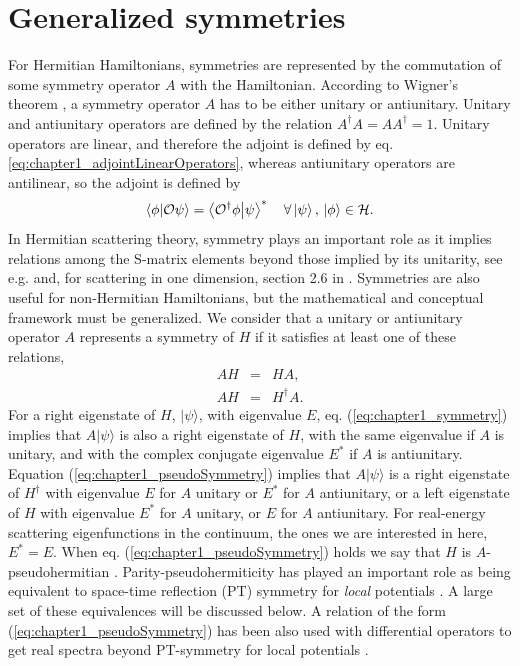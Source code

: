\section{Generalized symmetries\label{sec:chapter1_generalizedSymmetries}}

For Hermitian  Hamiltonians, symmetries are represented by the commutation of some symmetry operator $A$ with the Hamiltonian. According to Wigner's theorem \cite{Wigner1959}, a symmetry operator $A$ has to be either unitary or antiunitary. Unitary and antiunitary operators are defined by the relation $A^\dagger A = A A^\dagger = 1$. Unitary operators are linear, and therefore the adjoint is defined by eq. \eqref{eq:chapter1_adjointLinearOperators}, whereas antiunitary operators are antilinear, so the adjoint is defined by
%
\begin{equation}
  \braket{\phi}{\mathcal{O}\psi} = \braket{\mathcal{O}^\dagger\phi}{\psi}^*\quad\forall\ket{\psi},\,\ket{\phi}\in\mathcal{H}.
  \label{eq:chapter1_adjointAntiLinearOperators}
\end{equation}
%
In Hermitian scattering theory, symmetry plays an important role  as it implies relations among
the S-matrix elements beyond those implied by its unitarity, see e.g. \cite{Taylor1972} and, for scattering in one dimension, section 2.6 in \cite{Muga2004}. Symmetries are also useful for  non-Hermitian Hamiltonians, but the mathematical and conceptual
framework must be generalized. We consider that a unitary or antiunitary operator $A$ represents a symmetry of $H$ if it satisfies at least one of these relations,
%
\begin{eqnarray}
  AH&=&HA,
  \label{eq:chapter1_symmetry}
  \\
  AH&=&H^\dagger A.
  \label{eq:chapter1_pseudoSymmetry}
\end{eqnarray}
%
For a right eigenstate of $H$, $|\psi\rangle$,
with eigenvalue $E$, eq. (\ref{eq:chapter1_symmetry}) implies that
$A|\psi\rangle$ is also a right  eigenstate of $H$, with the
same eigenvalue if $A$ is unitary, and with the complex conjugate eigenvalue $E^*$ if $A$ is antiunitary.
Equation (\ref{eq:chapter1_pseudoSymmetry}) implies that $A|\psi\rangle$ is a right eigenstate of $H^\dagger$
with eigenvalue $E$ for $A$ unitary or $E^*$ for $A$ antiunitary, or a left eigenstate of $H$ with eigenvalue $E^*$ for $A$ unitary, or $E$
for $A$ antiunitary. For real-energy scattering
eigenfunctions in the continuum, the ones we are interested in here, $E^*=E$.
When eq. (\ref{eq:chapter1_pseudoSymmetry}) holds we say that $H$ is $A$-pseudohermitian \cite{Mostafazadeh2010}.
Parity-pseudohermiticity has played an important role as being equivalent to space-time reflection (PT) symmetry for {\it local} potentials
\cite{Mostafazadeh2010,Znojil2015}. A large set of these equivalences
will be discussed below.
A relation of the form (\ref{eq:chapter1_pseudoSymmetry}) has been also used with differential operators  to get real spectra beyond
PT-symmetry for local potentials  \cite{Nixon2016,Nixon2016a}.

